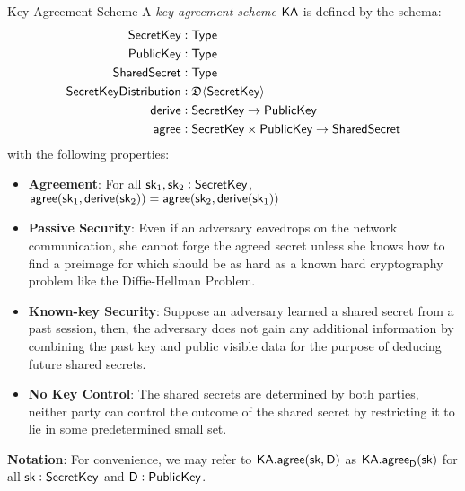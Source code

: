 \begin{definitiontoc}{Key-Agreement Scheme}
    A \emph{key-agreement scheme} ${\textsf{KA}}$ is defined by the schema:
    \begin{align*}
        {\textsf{SecretKey}}    &: {\textsf{Type}} \\
        {\textsf{PublicKey}}    &: {\textsf{Type}} \\
        {\textsf{SharedSecret}} &: {\textsf{Type}} \\
        {\textsf{SecretKeyDistribution}} &: \mathfrak{D}\langle{{\textsf{SecretKey}}}\rangle \\
        {\textsf{derive}}       &: {\textsf{SecretKey}} \to {\textsf{PublicKey}} \\
        {\textsf{agree}}        &: {\textsf{SecretKey}} \times {\textsf{PublicKey}} \to {\textsf{SharedSecret}}
    \end{align*}
    with the following properties:
    \begin{itemize}
        \item \textbf{Agreement}: For all ${\textsf{sk}}_1, {\textsf{sk}}_2 : {\textsf{SecretKey}}$, ${\textsf{agree}}({\textsf{sk}}_1, {\textsf{derive}}({\textsf{sk}}_2)) = {\textsf{agree}}({\textsf{sk}}_2, {\textsf{derive}}({\textsf{sk}}_1))$
        \item \textbf{Passive Security}: Even if an adversary eavedrops on the network communication, she cannot forge the agreed secret unless she knows how to find a preimage for \derive{} which should be as hard as a known hard cryptography problem like the Diffie-Hellman Problem.
        \item \textbf{Known-key Security}: Suppose an adversary learned a shared secret from a past session, then, the adversary does not gain any additional information by combining the past key and public visible data for the purpose of deducing future shared secrets.
        \item \textbf{No Key Control}: The shared secrets are determined by both parties, neither party can control the outcome of the shared secret by restricting it to lie in some predetermined small set.
    \end{itemize}
\end{definitiontoc}

    \textbf{Notation}: For convenience, we may refer to ${\textsf{KA}}.{\textsf{agree}}({\textsf{sk}}, \textsf{D})$ as ${\textsf{KA}}.{\textsf{agree}}_{\textsf{D}}({\textsf{sk}})$ for all ${\textsf{sk}} : {\textsf{SecretKey}}$ and $\textsf{D} : {\textsf{PublicKey}}$.

